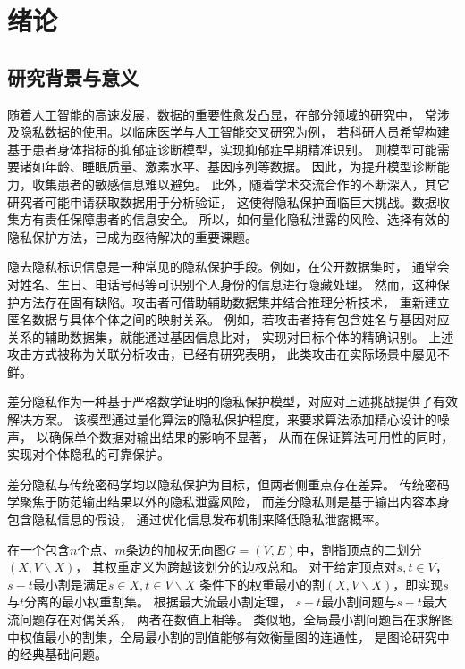 \chapter{绪论}
\label{chap:introduction}
\section{研究背景与意义}

随着人工智能的高速发展，数据的重要性愈发凸显，在部分领域的研究中，
常涉及隐私数据的使用。以临床医学与人工智能交叉研究为例，
若科研人员希望构建基于患者身体指标的抑郁症诊断模型，实现抑郁症早期精准识别。
则模型可能需要诸如年龄、睡眠质量、激素水平、基因序列等数据。
因此，为提升模型诊断能力，收集患者的敏感信息难以避免。
此外，随着学术交流合作的不断深入，其它研究者可能申请获取数据用于分析验证，
这使得隐私保护面临巨大挑战。数据收集方有责任保障患者的信息安全。
所以，如何量化隐私泄露的风险、选择有效的隐私保护方法，已成为亟待解决的重要课题。

隐去隐私标识信息是一种常见的隐私保护手段。例如，在公开数据集时，
通常会对姓名、生日、电话号码等可识别个人身份的信息进行隐藏处理。
然而，这种保护方法存在固有缺陷。攻击者可借助辅助数据集并结合推理分析技术，
重新建立匿名数据与具体个体之间的映射关系。
例如，若攻击者持有包含姓名与基因对应关系的辅助数据集，就能通过基因信息比对，
实现对目标个体的精确识别。
上述攻击方式被称为关联分析攻击，已经有研究表明，
此类攻击在实际场景中屡见不鲜。\cite{narayanan2016precautionary}

差分隐私作为一种基于严格数学证明的隐私保护模型，对应对上述挑战提供了有效解决方案。
该模型通过量化算法的隐私保护程度，来要求算法添加精心设计的噪声，
以确保单个数据对输出结果的影响不显著，
从而在保证算法可用性的同时，实现对个体隐私的可靠保护。\cite{vadhan2017complexity}

差分隐私与传统密码学均以隐私保护为目标，但两者侧重点存在差异。
传统密码学聚焦于防范输出结果以外的隐私泄露风险，
而差分隐私则是基于输出内容本身包含隐私信息的假设，
通过优化信息发布机制来降低隐私泄露概率。

在一个包含$n$个点、$m$条边的加权无向图$G=(V,E)$中，割指顶点的二划分$(X,V\backslash X)$，
其权重定义为跨越该划分的边权总和。
对于给定顶点对$s,t\in V$，$s-t$最小割是满足$s\in X,t\in V\backslash X$
条件下的权重最小的割$(X,V\backslash X)$，即实现$s$与$t$分离的最小权重割集。
根据最大流最小割定理，
$s-t$最小割问题与$s-t$最大流问题存在对偶关系，
两者在数值上相等。\cite{ford1956maximal}
类似地，全局最小割问题旨在求解图中权值最小的割集，全局最小割的割值能够有效衡量图的连通性，
是图论研究中的经典基础问题。

